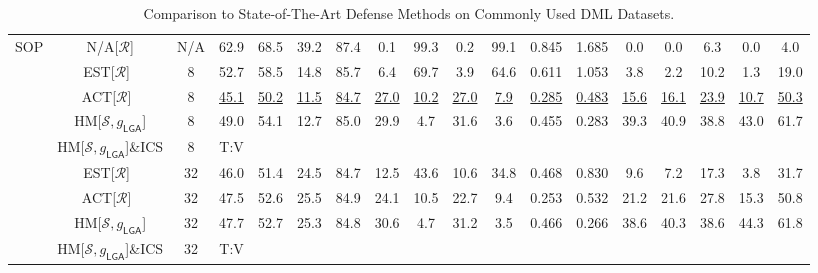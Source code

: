 \begin{table*}
{\begin{tabular}{c|cc|cccc|ccccc|ccccc|c}
\multirow{9}{*}{SOP} & N/A{[}$\mathcal{R}${]} & N/A & 62.9 & 68.5 & 39.2 & 87.4 & 0.1 & 99.3 & 0.2 & 99.1 & 0.845 & 1.685 & 0.0 & 0.0 & 6.3 & 0.0 & 4.0\tabularnewline
\cline{2-18} \cline{3-18} \cline{4-18} \cline{5-18} \cline{6-18} \cline{7-18} \cline{8-18} \cline{9-18} \cline{10-18} \cline{11-18} \cline{12-18} \cline{13-18} \cline{14-18} \cline{15-18} \cline{16-18} \cline{17-18} \cline{18-18} 
 & EST{[}$\mathcal{R}${]}~\cite{advrank} & 8 & 52.7 & 58.5 & 14.8 & 85.7 & 6.4 & 69.7 & 3.9 & 64.6 & 0.611 & 1.053 & 3.8 & 2.2 & 10.2 & 1.3 & 19.0\tabularnewline
 & ACT{[}$\mathcal{R}${]}~\cite{robrank} & 8 & \uline{45.1} & \uline{50.2} & \uline{11.5} & \uline{84.7} & \uline{27.0} & \uline{10.2} & \uline{27.0} & \uline{7.9} & \uline{0.285} & \uline{0.483} & \uline{15.6} & \uline{16.1} & \uline{23.9} & \uline{10.7} & \uline{50.3}\tabularnewline
 & HM{[}$\mathcal{S},g_{\mathsf{LGA}}${]} & 8 & 49.0 & 54.1 & 12.7 & 85.0 & 29.9 & 4.7 & 31.6 & 3.6 & 0.455 & 0.283 & 39.3 & 40.9 & 38.8 & 43.0 & 61.7\tabularnewline
 & HM{[}$\mathcal{S},g_{\mathsf{LGA}}${]}\&ICS & 8 & T:V &  &  &  &  &  &  &  &  &  &  &  &  &  & \tabularnewline
\cline{2-18} \cline{3-18} \cline{4-18} \cline{5-18} \cline{6-18} \cline{7-18} \cline{8-18} \cline{9-18} \cline{10-18} \cline{11-18} \cline{12-18} \cline{13-18} \cline{14-18} \cline{15-18} \cline{16-18} \cline{17-18} \cline{18-18} 
 & EST{[}$\mathcal{R}${]}~\cite{advrank} & 32 & 46.0 & 51.4 & 24.5 & 84.7 & 12.5 & 43.6 & 10.6 & 34.8 & 0.468 & 0.830 & 9.6 & 7.2 & 17.3 & 3.8 & 31.7\tabularnewline
 & ACT{[}$\mathcal{R}${]}~\cite{robrank} & 32 & 47.5 & 52.6 & 25.5 & 84.9 & 24.1 & 10.5 & 22.7 & 9.4 & 0.253 & 0.532 & 21.2 & 21.6 & 27.8 & 15.3 & 50.8\tabularnewline
 & HM{[}$\mathcal{S},g_{\mathsf{LGA}}${]} & 32 & 47.7 & 52.7 & 25.3 & 84.8 & 30.6 & 4.7 & 31.2 & 3.5 & 0.466 & 0.266 & 38.6 & 40.3 & 38.6 & 44.3 & 61.8\tabularnewline
 & HM{[}$\mathcal{S},g_{\mathsf{LGA}}${]}\&ICS & 32 & T:V &  &  &  &  &  &  &  &  &  &  &  &  &  & \tabularnewline

	\bottomrule

\end{tabular}}
	\vspace{-0.5em}
\caption{Comparison to State-of-The-Art Defense Methods on Commonly Used DML Datasets.}
	\label{tab:sota}
\end{table*}
